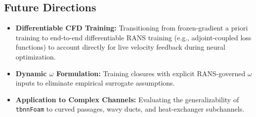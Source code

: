 \documentclass[11pt,a4paper]{article}
\begin{document}
\subsection{Future Directions}
\begin{itemize}
    \item \textbf{Differentiable CFD Training:} Transitioning from frozen-gradient a priori training to end-to-end differentiable RANS training (e.g., adjoint-coupled loss functions) to account directly for live velocity feedback during neural optimization.
    \item \textbf{Dynamic $\omega$ Formulation:} Training closures with explicit RANS-governed $\omega$ inputs to eliminate empirical surrogate assumptions.
    \item \textbf{Application to Complex Channels:} Evaluating the generalizability of \texttt{tbnnFoam} to curved passages, wavy ducts, and heat-exchanger subchannels.
\end{itemize}



\end{document}

